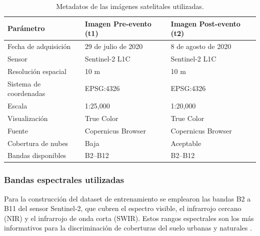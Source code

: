 \documentclass[12pt, a4paper]{article}
\begin{document}
\begin{table}[H]
\centering
\caption{Metadatos de las imágenes satelitales utilizadas.}
\label{tab:metadata}
\begin{tabular}{lll}
\toprule
\textbf{Parámetro} & \textbf{Imagen Pre-evento (t1)} & \textbf{Imagen Post-evento (t2)} \\
\midrule
Fecha de adquisición    & 29 de julio de 2020   & 8 de agosto de 2020 \\
Sensor                  & Sentinel-2 L1C        & Sentinel-2 L1C \\
Resolución espacial     & 10 m                  & 10 m \\
Sistema de coordenadas  & EPSG:4326             & EPSG:4326 \\
Escala                  & 1:25,000              & 1:20,000 \\
Visualización           & True Color            & True Color \\
Fuente                  & Copernicus Browser    & Copernicus Browser \\
Cobertura de nubes      & Baja                  & Aceptable \\
Bandas disponibles      & B2--B12               & B2--B12 \\
\bottomrule
\end{tabular}
\end{table}

\subsubsection*{Bandas espectrales utilizadas}

Para la construcción del dataset de entrenamiento se emplearon las bandas B2 a B11 del
sensor Sentinel-2, que cubren el espectro visible, el infrarrojo cercano (NIR) y el
infrarrojo de onda corta (SWIR). Estos rangos espectrales son los más informativos para
la discriminación de coberturas del suelo urbanas y naturales \cite{lillesand2015}.
\end{document}
